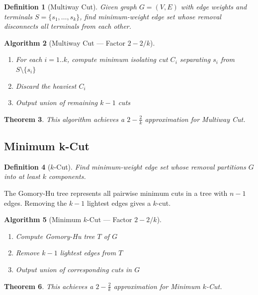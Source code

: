 \documentclass[11pt,oneside]{book}
\newtheorem{theorem}{Theorem}[chapter]
\newtheorem{definition}[theorem]{Definition}
\newtheorem{algorithmdef}[theorem]{Algorithm}
\begin{document}
\begin{definition}[Multiway Cut]
Given graph $G = (V, E)$ with edge weights and terminals $S = \{s_1, \dots, s_k\}$, find minimum-weight edge set whose removal disconnects all terminals from each other.
\end{definition}

\begin{algorithmdef}[Multiway Cut — Factor $2-2/k$]
\begin{enumerate}
    \item For each $i = 1..k$, compute minimum isolating cut $C_i$ separating $s_i$ from $S \setminus \{s_i\}$
    \item Discard the heaviest $C_i$
    \item Output union of remaining $k-1$ cuts
\end{enumerate}
\end{algorithmdef}

\begin{theorem}
This algorithm achieves a $2 - \frac{2}{k}$ approximation for Multiway Cut.
\end{theorem}

\subsection{Minimum k-Cut}

\begin{definition}[$k$-Cut]
Find minimum-weight edge set whose removal partitions $G$ into at least $k$ components.
\end{definition}

The Gomory-Hu tree represents all pairwise minimum cuts in a tree with $n-1$ edges. Removing the $k-1$ lightest edges gives a $k$-cut.

\begin{algorithmdef}[Minimum $k$-Cut — Factor $2-2/k$]
\begin{enumerate}
    \item Compute Gomory-Hu tree $T$ of $G$
    \item Remove $k-1$ lightest edges from $T$
    \item Output union of corresponding cuts in $G$
\end{enumerate}
\end{algorithmdef}

\begin{theorem}
This achieves a $2 - \frac{2}{k}$ approximation for Minimum $k$-Cut.
\end{theorem}
\end{document}
